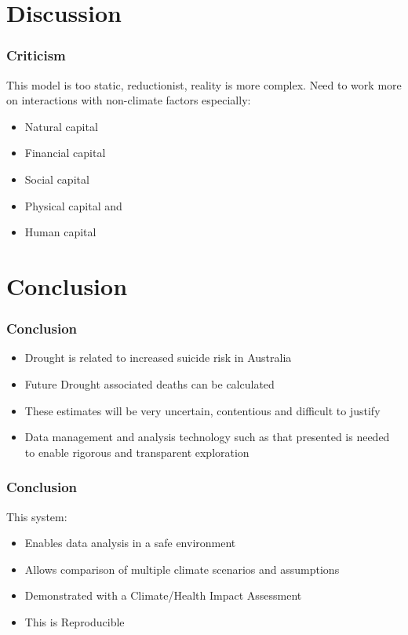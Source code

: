 \documentclass[bigger]{beamer}
\begin{document}
\section{Discussion}
\label{sec-4}
\begin{frame}
\frametitle{Criticism}
\label{sec-4-1}

This model is too static, reductionist, reality is more complex. Need to work more on interactions with non-climate factors especially: 
\begin{itemize}
\item Natural capital
\item Financial capital
\item Social capital
\item Physical capital and
\item Human capital
\end{itemize}
\end{frame}
\section{Conclusion}
\label{sec-5}
\begin{frame}
\frametitle{Conclusion}
\label{sec-5-1}

\begin{itemize}
\item Drought is related to increased suicide risk in Australia
\item Future Drought associated deaths can be calculated
\item These estimates will be very uncertain, contentious and difficult to justify
\item Data management and analysis technology such as that presented is needed to enable rigorous and transparent exploration
\end{itemize}
\end{frame}
\begin{frame}
\frametitle{Conclusion}
\label{sec-5-2}

This system:
\begin{itemize}
\item Enables data analysis in a safe environment
\item Allows comparison of multiple climate scenarios and assumptions
\item Demonstrated with a Climate/Health Impact Assessment
\item This is Reproducible
\end{itemize}
\end{frame}
\end{document}
